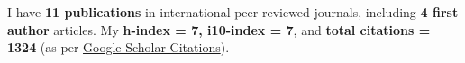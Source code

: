 
I have \textbf{11 publications} in international peer-reviewed journals, including \textbf{4 first author} articles. My \textbf{h-index = 7, i10-index = 7}, and \textbf{total citations = 1324} (as per \href{https://scholar.google.com/citations?hl=en&user=6-7FYjIAAAAJ&authuser=2}{Google Scholar Citations}).

\nocite{*}


\printbibliography[heading={none},title={Journal Articles},type=article]



